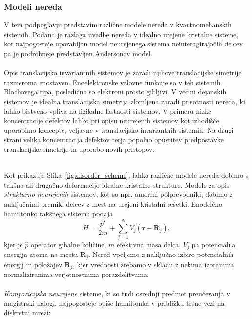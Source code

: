 \documentclass[10pt,a4paper]{article}
\begin{document}
\subsubsection{Modeli nereda}
V tem podpoglavju predstavim različne modele nereda v kvantnomehanskih sistemih. Podana je razlaga uvedbe nereda v idealno urejene kristalne sisteme, kot najpogosteje uporabljan model neurejenega sistema neinteragirajočih delcev pa je podrobneje predstavljen Andersonov model. \\\\
Opis translacijsko invariantnih sistemov je zaradi njihove translacijske simetrije razmeroma enostaven. Enoelektronske valovne funkcije so v teh sistemih Blochovega tipa, posledično so elektroni prosto gibljivi. V večini dejanskih sistemov je idealna translacijska simetrija zlomljena zaradi prisotnosti nereda, ki lahko bistveno vpliva na fizikalne lastnosti sistemov. V primeru nizke koncentracije defektov lahko pri opisu neurejenih sistemov kot izhodišče uporabimo koncepte, veljavne v translacijsko invariantnih sistemih. Na drugi strani velika koncentracija defektov terja popolno opustitev predpostavke translacijske simetrije in uporabo novih pristopov. \\\\
\begin{minipage}[t]{0.54\textwidth}
Kot prikazuje Slika~\ref{fig:disorder_scheme}, lahko različne modele nereda dobimo s takšno ali drugačno deformacijo idealne kristalne strukture. Modele za opis \emph{strukturno neurejenih} sistemov, kot so npr. amorfni polprevodniki,  dobimo z naključnimi premiki delcev z mest na urejeni kristalni rešetki. Enodelčno hamiltonko takšnega sistema podaja 
\begin{equation}\label{eq:cont_ham}
H=\frac{\hat{p}^2}{2m} + \sum\limits_{j=1}^N V_j(\textbf{r}- \textbf{R}_j), 
\end{equation}
kjer je $\hat{p}$ operator gibalne količine, $m$ efektivna masa delca, $V_j$ pa potencialna energija atoma na mestu $\textbf{R}_j$. Nered vpeljemo z naključno izbiro potencialnih energij in položajev $\textbf{R}_j$, kjer vrednosti žrebamo v skladu z nekima izbranima normaliziranima verjetnostnima porazdelitvama. \\\\
\emph{Kompozicijsko neurejene} sisteme, ki so tudi osrednji predmet preučevanja v magistrski nalogi, najpogosteje opiše hamiltonka v približku tesne vezi na diskretni mreži:
\end{minipage}\hfill
\end{document}

